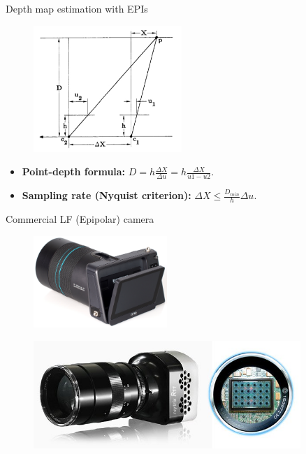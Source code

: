 \begin{frame}{Depth map estimation with EPIs}

\begin{figure}[h!]
\includegraphics[width=0.5\textwidth]{./images/stereo-dist.jpg}
\end{figure}

\begin{block}{}
\begin{itemize}
\item \textbf{Point-depth formula:} $D= h\frac{\Delta X}{\Delta u}=h\frac{\Delta X}{u1-u2}$.

\item \textbf{Sampling rate (Nyquist criterion):} $\Delta X\leq \frac{D_{min}}{h}\Delta u$.

\end{itemize}
\end{block}
\end{frame}

\begin{frame}{Commercial LF (Epipolar) camera}

\begin{figure}[h!]
\centering
\includegraphics[width=0.45\textwidth]{./images/lytro.jpg}
\end{figure}

\begin{figure}[h!]
\centering
\includegraphics[width=0.90\textwidth]{./images/raytrix.jpg}
\end{figure}
\end{frame}


